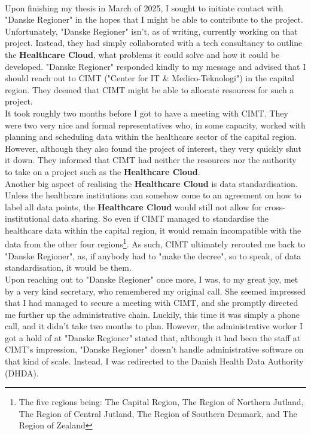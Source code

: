 \\
Upon finishing my thesis in March of 2025, I sought to initiate contact with "Danske Regioner" in the hopes that I might be able to contribute to the project. Unfortunately, "Danske Regioner" isn't, as of writing, currently working on that project. Instead, they had simply collaborated with a tech consultancy to outline the \textbf{Healthcare Cloud}, what problems it could solve and how it could be developed. "Danske Regioner" responded kindly to my message and advised that I should reach out to CIMT ("Center for IT \& Medico-Teknologi") in the capital region. They deemed that CIMT might be able to allocate resources for such a project.
\\
It took roughly two months before I got to have a meeting with CIMT. They were two very nice and formal representatives who, in some capacity, worked with planning and scheduling data within the healthcare sector of the capital region. However, although they also found the project of interest, they very quickly shut it down. They informed that CIMT had neither the resources nor the authority to take on a project such as the \textbf{Healthcare Cloud}.
\\
Another big aspect of realising the \textbf{Healthcare Cloud} is data standardisation. Unless the healthcare institutions can somehow come to an agreement on how to label all data points, the \textbf{Healthcare Cloud} would still not allow for cross-institutional data sharing. So even if CIMT managed to standardise the healthcare data within the capital region, it would remain incompatible with the data from the other four regions\footnote{The five regions being: The Capital Region, The Region of Northern Jutland, The Region of Central Jutland, The Region of Southern Denmark, and The Region of Zealand}. As such, CIMT ultimately rerouted me back to "Danske Regioner", as, if anybody had to "make the decree", so to speak, of data standardisation, it would be them.
\\
Upon reaching out to "Danske Regioner" once more, I was, to my great joy, met by a very kind secretary, who remembered my original call. She seemed impressed that I had managed to secure a meeting with CIMT, and she promptly directed me further up the administrative chain. Luckily, this time it was simply a phone call, and it didn't take two months to plan. However, the administrative worker I got a hold of at "Danske Regioner" stated that, although it had been the staff at CIMT's impression, "Danske Regioner" doesn't handle administrative software on that kind of scale. Instead, I was redirected to the Danish Health Data Authority (DHDA).
